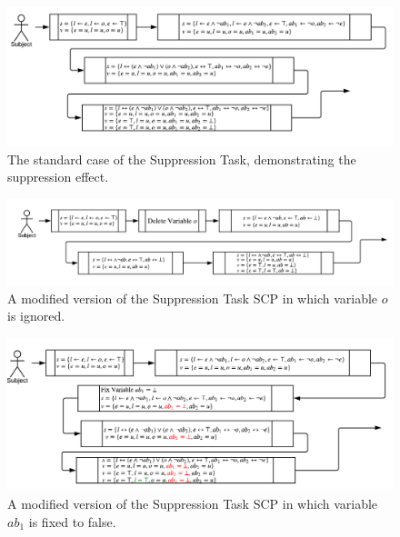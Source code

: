 \documentclass{article}
\begin{document}
\begin{figure}
\begin{center}
 \centering \includegraphics[scale=0.75]{suppressionSCP_normal}
\caption{The standard case of the Suppression Task, demonstrating the suppression effect. }
\label {fig:supnormal}
\end{center}
\end{figure}

\begin{figure}
\begin{center}
 \centering \includegraphics[scale=0.75]{suppressionSCP_mod}
\caption{A modified version of the Suppression Task SCP in which variable $o$ is ignored. }
\label {fig:supmod}
\end{center}
\end{figure}

\begin{figure}
\begin{center}
 \centering \includegraphics[scale=0.75]{suppressionSCP_mod2}
\caption{A modified version of the Suppression Task SCP in which variable $ab_1$ is fixed to false. }
\label {fig:supmod2}
\end{center}
\end{figure}
\end{document}

